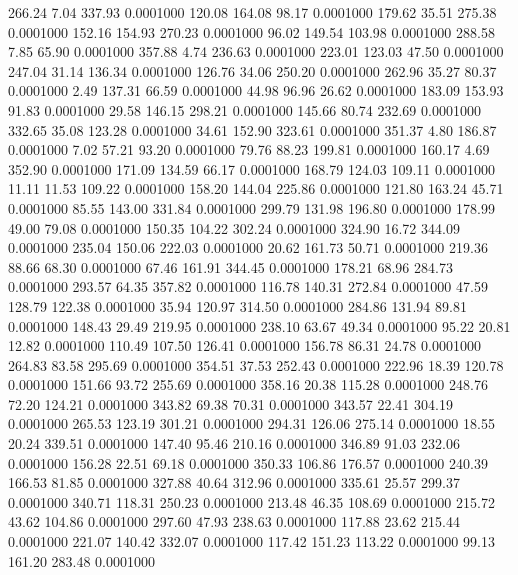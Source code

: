  266.24    7.04  337.93   0.0001000
 120.08  164.08   98.17   0.0001000
 179.62   35.51  275.38   0.0001000
 152.16  154.93  270.23   0.0001000
  96.02  149.54  103.98   0.0001000
 288.58    7.85   65.90   0.0001000
 357.88    4.74  236.63   0.0001000
 223.01  123.03   47.50   0.0001000
 247.04   31.14  136.34   0.0001000
 126.76   34.06  250.20   0.0001000
 262.96   35.27   80.37   0.0001000
   2.49  137.31   66.59   0.0001000
  44.98   96.96   26.62   0.0001000
 183.09  153.93   91.83   0.0001000
  29.58  146.15  298.21   0.0001000
 145.66   80.74  232.69   0.0001000
 332.65   35.08  123.28   0.0001000
  34.61  152.90  323.61   0.0001000
 351.37    4.80  186.87   0.0001000
   7.02   57.21   93.20   0.0001000
  79.76   88.23  199.81   0.0001000
 160.17    4.69  352.90   0.0001000
 171.09  134.59   66.17   0.0001000
 168.79  124.03  109.11   0.0001000
  11.11   11.53  109.22   0.0001000
 158.20  144.04  225.86   0.0001000
 121.80  163.24   45.71   0.0001000
  85.55  143.00  331.84   0.0001000
 299.79  131.98  196.80   0.0001000
 178.99   49.00   79.08   0.0001000
 150.35  104.22  302.24   0.0001000
 324.90   16.72  344.09   0.0001000
 235.04  150.06  222.03   0.0001000
  20.62  161.73   50.71   0.0001000
 219.36   88.66   68.30   0.0001000
  67.46  161.91  344.45   0.0001000
 178.21   68.96  284.73   0.0001000
 293.57   64.35  357.82   0.0001000
 116.78  140.31  272.84   0.0001000
  47.59  128.79  122.38   0.0001000
  35.94  120.97  314.50   0.0001000
 284.86  131.94   89.81   0.0001000
 148.43   29.49  219.95   0.0001000
 238.10   63.67   49.34   0.0001000
  95.22   20.81   12.82   0.0001000
 110.49  107.50  126.41   0.0001000
 156.78   86.31   24.78   0.0001000
 264.83   83.58  295.69   0.0001000
 354.51   37.53  252.43   0.0001000
 222.96   18.39  120.78   0.0001000
 151.66   93.72  255.69   0.0001000
 358.16   20.38  115.28   0.0001000
 248.76   72.20  124.21   0.0001000
 343.82   69.38   70.31   0.0001000
 343.57   22.41  304.19   0.0001000
 265.53  123.19  301.21   0.0001000
 294.31  126.06  275.14   0.0001000
  18.55   20.24  339.51   0.0001000
 147.40   95.46  210.16   0.0001000
 346.89   91.03  232.06   0.0001000
 156.28   22.51   69.18   0.0001000
 350.33  106.86  176.57   0.0001000
 240.39  166.53   81.85   0.0001000
 327.88   40.64  312.96   0.0001000
 335.61   25.57  299.37   0.0001000
 340.71  118.31  250.23   0.0001000
 213.48   46.35  108.69   0.0001000
 215.72   43.62  104.86   0.0001000
 297.60   47.93  238.63   0.0001000
 117.88   23.62  215.44   0.0001000
 221.07  140.42  332.07   0.0001000
 117.42  151.23  113.22   0.0001000
  99.13  161.20  283.48   0.0001000
